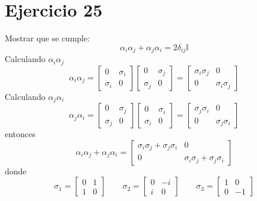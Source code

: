 \section*{Ejercicio 25}
Mostrar que se cumple:
\begin{equation*}
    \alpha_i \alpha_j + \alpha_j \alpha_i = 2 \delta_{ij} \mathbb{I}
\end{equation*}
Calculando $\alpha_i\alpha_j$
\begin{equation*}
    \alpha_i\alpha_j = \left[\begin{matrix}
        0 & \sigma_i \\
        \sigma_i & 0 
    \end{matrix}\right]
    \left[\begin{matrix}
        0 & \sigma_j \\
        \sigma_j & 0 
    \end{matrix}\right] = 
    \left[\begin{matrix}
        \sigma_i\sigma_j &0 \\
        0&\sigma_i\sigma_j  
    \end{matrix}\right]
\end{equation*}
Calculando $\alpha_j\alpha_i$
\begin{equation*}
    \alpha_j\alpha_i = \left[\begin{matrix}
        0 & \sigma_j \\
        \sigma_j& 0 
    \end{matrix}\right]
    \left[\begin{matrix}
        0 & \sigma_i \\
        \sigma_i & 0 
    \end{matrix}\right] = 
    \left[\begin{matrix}
        \sigma_j\sigma_i &0 \\
        0&\sigma_j\sigma_i  
    \end{matrix}\right]
\end{equation*}
entonces
\begin{equation*}
    \alpha_i\alpha_j + \alpha_j\alpha_i = 
    \left[\begin{matrix}
        \sigma_i\sigma_j+\sigma_j\sigma_i &0 \\
        0&\sigma_i\sigma_j+\sigma_j\sigma_i  
    \end{matrix}\right]
\end{equation*}
donde 
\begin{equation*}
    \sigma_1 =\left[\begin{matrix}
        0 & 1\\
        1 & 0
    \end{matrix}\right] \qquad 
    \sigma_2 =\left[\begin{matrix}
        0 & -i\\
        i & 0
    \end{matrix}\right] \qquad
    \sigma_3 =\left[\begin{matrix}
        1 & 0\\
        0 & -1
    \end{matrix}\right] 
\end{equation*}
